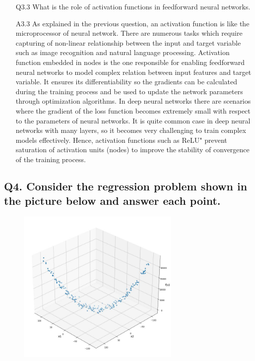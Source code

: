 \documentclass[11pt]{scrartcl}
\begin{document}
\begin{itemize}
\item[Q3.3] What is the role of activation functions in feedforward neural networks.
\item[A3.3] As explained in the previous question, an activation function is like the microprocessor of neural network. There are numerous tasks which require capturing of non-linear relationship between the input and target variable such as image recognition and natural language processing. Activation function embedded in nodes is the one responsible for enabling feedforward neural networks to model complex relation between input features and target variable. It ensures its differentiability so the gradients can be calculated during the training process and be used to update the network parameters through optimization algorithms. In deep neural networks there are scenarios where the gradient of the loss function becomes extremely small with respect to the parameters of neural networks. It is quite common case in deep neural networks with many layers, so it becomes very challenging to train complex models effectively. Hence, activation functions such as ReLU" prevent saturation of activation units (nodes) to improve the stability of convergence of the training process.\\
\end{itemize}
\subsection*{Q4. Consider the regression problem shown in the picture below and answer each point.}

\begin{figure}[htbp] %
    \centering
    \includegraphics[width=0.7\textwidth]{../parabolic.jpg}
\end{figure}
\end{document}
